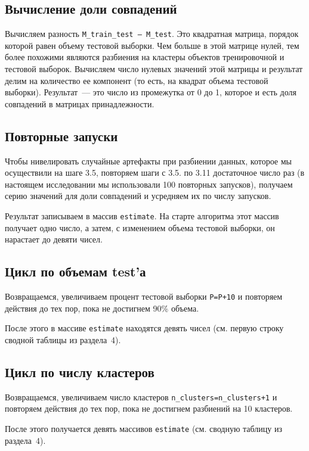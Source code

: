 \documentclass[a4paper,12pt]{article}
\begin{document}
\subsection{Вычисление доли совпадений}

Вычисляем разность \texttt{M\_train\_test – M\_test}. Это квадратная матрица, порядок которой равен объему тестовой выборки. Чем больше в этой матрице нулей, тем более похожими являются разбиения на кластеры объектов тренировочной и тестовой выборок. Вычисляем число нулевых значений этой матрицы и результат делим на количество ее компонент (то есть, на квадрат объема тестовой выборки). Результат — это число из промежутка от 0 до 1, которое и есть доля совпадений в матрицах принадлежности.


\subsection{Повторные запуски}

Чтобы нивелировать случайные артефакты при разбиении данных, которое мы осуществили на шаге 3.5, повторяем шаги с 3.5. по 3.11 достаточное число раз (в настоящем исследовании мы использовали 100 повторных запусков), получаем серию значений для доли совпадений и усредняем их по числу запусков.

Результат записываем в массив \texttt{estimate}. На старте алгоритма этот массив получает одно число, а затем, с изменением объема тестовой выборки, он нарастает до девяти чисел.


\subsection{Цикл по объемам test'а}

Возвращаемся, увеличиваем процент тестовой выборки \texttt{P=P+10} и повторяем действия до тех пор, пока не достигнем 90\% объема.

После этого в массиве \texttt{estimate} находятся девять чисел (см. первую строку сводной таблицы из раздела 4).

\subsection{Цикл по числу кластеров}

Возвращаемся, увеличиваем число кластеров \texttt{n\_clusters=n\_clusters+1} и повторяем действия до тех пор, пока не достигнем разбиений на 10 кластеров.

После этого получается девять массивов \texttt{estimate} (см. сводную таблицу из раздела 4).
\end{document}
